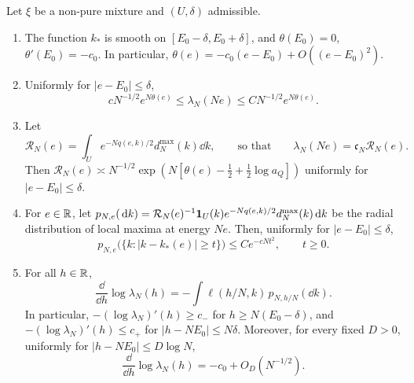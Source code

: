 \begin{lemma}\label{lem:mo-radial}
Let $\xi$ be a non-pure mixture and $(U,\delta)$ admissible.
\begin{enumerate}
\item[(a)] The function $k_*$ is smooth on $[E_0-\delta,E_0+\delta]$, and $\theta(E_0)=0$, $\theta'(E_0)=-c_0$. In particular, $\theta(e)=-c_0(e-E_0)+O((e-E_0)^2)$.
\item[(b)] Uniformly for $|e-E_0|\le\delta$,
\begin{equation}\label{eq:mo-radial-normalization}
cN^{-1/2}e^{N\theta(e)}\le\lambda_N(Ne)\le CN^{-1/2}e^{N\theta(e)}.
\end{equation}
\item[(c)] Let
\begin{equation}\label{eq:mo-raw}
\mathcal R_N(e)=\int_Ue^{-Nq(e,k)/2}d_N^{\max}(k)\dd k,\qquad\text{so that}\qquad\lambda_N(Ne)=\mathfrak c_N\mathcal R_N(e).
\end{equation}
Then $\mathcal R_N(e)\asymp N^{-1/2}\exp(N[\theta(e)-\frac12+\frac12\log a_Q])$ uniformly for $|e-E_0|\le\delta$.
\item[(d)] For $e\in\mathbb R$, let $p_{N,e}(\,\mathrm d k)=\mathcal R_N(e)^{-1}\mathbf 1_U(k)e^{-Nq(e,k)/2}d_N^{\max}(k)\,\mathrm d k$ be the radial distribution of local maxima at energy $Ne$. Then, uniformly for $|e-E_0|\le\delta$,
\begin{equation}\label{eq:mo-radial-concentration}
p_{N,e}\bigl(\{k:|k-k_*(e)|\ge t\}\bigr)\le Ce^{-cNt^2},\qquad t\ge0.
\end{equation}
\item[(e)] For all $h\in\mathbb R$,
\begin{equation}\label{eq:mo-exact-slope}
\frac{\dd}{\dd h}\log\lambda_N(h)=-\int\ell(h/N,k)\,p_{N,h/N}(\dd k).
\end{equation}
In particular, $-(\log\lambda_N)'(h)\ge c_-$ for $h\ge N(E_0-\delta)$, and $-(\log\lambda_N)'(h)\le c_+$ for $|h-NE_0|\le N\delta$. Moreover, for every fixed $D>0$, uniformly for $|h-NE_0|\le D\log N$,
\begin{equation}\label{eq:mo-micro-slope}
\frac{\dd}{\dd h}\log\lambda_N(h)=-c_0+O_D(N^{-1/2}).
\end{equation}
\end{enumerate}
\end{lemma}

